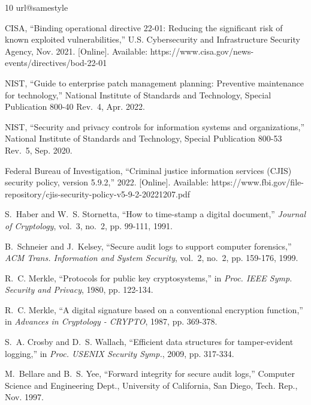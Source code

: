 \documentclass[journal]{IEEEtran}
\begin{document}
\begin{thebibliography}{10}
\providecommand{\url}[1]{#1}
\csname url@samestyle\endcsname

{CISA}, ``Binding operational directive 22-01: Reducing the significant risk
of known exploited vulnerabilities,'' U.S. Cybersecurity and Infrastructure
Security Agency, Nov. 2021. [Online]. Available:
\url{https://www.cisa.gov/news-events/directives/bod-22-01}

{NIST}, ``Guide to enterprise patch management planning: Preventive
maintenance for technology,'' National Institute of Standards and Technology,
Special Publication 800-40 Rev.~4, Apr. 2022.

{NIST}, ``Security and privacy controls for information systems and
organizations,'' National Institute of Standards and Technology, Special
Publication 800-53 Rev.~5, Sep. 2020.

{Federal Bureau of Investigation}, ``Criminal justice information services
(CJIS) security policy, version 5.9.2,'' 2022. [Online]. Available:
\url{https://www.fbi.gov/file-repository/cjis-security-policy-v5-9-2-20221207.pdf}

S.~Haber and W.~S. Stornetta, ``How to time-stamp a digital document,''
\emph{Journal of Cryptology}, vol.~3, no.~2, pp. 99-111, 1991.

B.~Schneier and J.~Kelsey, ``Secure audit logs to support computer
forensics,'' \emph{ACM Trans. Information and System Security}, vol.~2,
no.~2, pp. 159-176, 1999.

R.~C. Merkle, ``Protocols for public key cryptosystems,'' in \emph{Proc.
IEEE Symp. Security and Privacy}, 1980, pp. 122-134.

R.~C. Merkle, ``A digital signature based on a conventional encryption
function,'' in \emph{Advances in Cryptology - CRYPTO}, 1987, pp. 369-378.

S.~A. Crosby and D.~S. Wallach, ``Efficient data structures for
tamper-evident logging,'' in \emph{Proc. USENIX Security Symp.}, 2009, pp.
317-334.

M.~Bellare and B.~S. Yee, ``Forward integrity for secure audit logs,'' Computer
Science and Engineering Dept., University of California, San Diego, Tech. Rep.,
Nov. 1997.


\end{thebibliography}
\end{document}
